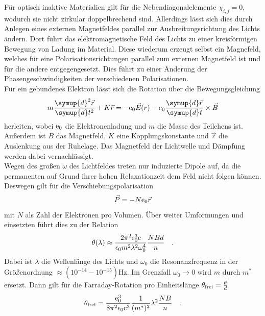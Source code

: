 \noindent
Für optisch inaktive Materialien gilt für die Nebendiagonalelemente $\chi_{i,j} = 0$, wodurch sie nicht zirkular doppelbrechend sind.
Allerdings lässt sich dies durch Anlegen eines externen Magnetfeldes parallel zur Ausbreitungsrichtung des Lichts ändern. 
Dort führt das elektromagnetische Feld des Lichts zu einer kreisförmigen Bewegung von Ladung im Material. Diese wiederum erzeugt selbst ein Magnefeld,
welches für eine Polarisationsrichtungen parallel zum externen Magnetfeld ist und für die andere entgegengesetzt. Dies führt zu einer Änderung der Phasengeschwindigkeiten der 
verschiedenen Polarisationen.\\
Für ein gebundenes Elektron lässt sich die Rotation über die Bewegungsgleichung
\begin{equation*}
    m \frac{\symup{d}^2\vec{r}}{\symup{d}t^2}+K\vec{r} = -\t{e}_0 \vec{E}(r)-\t{e}_0\frac{\symup{d}\vec{r}}{\symup{d}t}\times \vec{B}
\end{equation*}
herleiten, wobei $\text{e}_0$ \cite{e0} die Elektronenladung und $m$ die Masse des Teilchens ist.
Außerdem ist $B$ das Magnetfeld, $K$ eine Kopplungskonstante und $\vec r$ die Auslenkung aus der Ruhelage.
Das Magnetfeld der Lichtwelle und Dämpfung werden dabei vernachlässigt.\\
Wegen des großen $\omega$ des Lichtfeldes treten nur induzierte Dipole auf, da die permanenten auf Grund ihrer hohen Relaxationzeit dem 
Feld nicht folgen können. Deswegen gilt für die Verschiebungspolarisation 
\begin{equation*}
    \vec P = - N \text{e}_0 \vec r
\end{equation*}
mit $N$ als Zahl der Elektronen pro Volumen. Über weiter Umformungen und einsetzten führt dies zu der Relation
\begin{equation*}
    \theta(\lambda)\approx \frac{2 \pi^2 \text{e}_0^3 \text{c}}{\epsilon_0 m^2 \lambda^2 \omega_0^4}\frac{NBd}{n} \quad .
\end{equation*}
Dabei ist $ \lambda$ die Wellenlänge des Lichts und $\omega_0$ die Resonanzfrequenz in der Größenordnung $\approx \left(10^{-14} - 10^{-15}\right) \si{\hertz}$.
Im Grenzfall $\omega_0 \rightarrow 0$ wird $m$ durch $m^*$ ersetzt. 
Dann gilt für die Farraday-Rotation pro Einheitslänge $\theta_{\text{frei}} = \frac{\theta}{d}$
\begin{equation}
    \theta_\text{frei} = \frac{\text{e}_0^3}{8\pi^2\epsilon_0 \text{c}^3} \frac{1}{(m^*)^2}\lambda^2\frac{NB}{n} \quad .
    \label{eqn:mass}
\end{equation}

